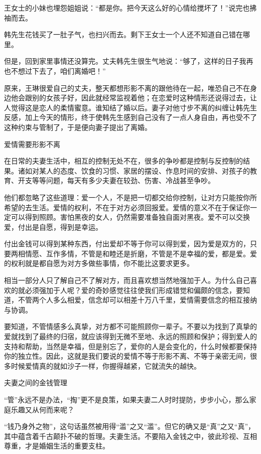\documentclass[12pt,UTF8]{ctexbook}
\begin{document}
王女士的小妹也埋怨姐姐说：“都是你。把今天这么好的心情给搅坏了！”说完也拂袖而去。

韩先生花钱买了一肚子气，也扫兴而去。剩下王女士一个人还不知道自己错在哪里。

但是，回到家里事情还没算完。丈夫韩先生很生气地说：“够了，这样的日子我再也不想过下去了，咱们离婚吧！”

原来，王琳很爱自己的丈夫，整天都想形影不离的跟他待在一起，唯恐自己不在身边他会跟别的女孩子好，因此就经常监视着他；在恋爱时这种情形还说得过去，让人觉得这是恋人的柔情蜜意。谁知结了婚以后。妻子对他寸步不离的纠缠让韩先生反感，加上今天的情形，终于使韩先生感到自己没有了一点人身自由，再也受不了这种约束与管制了，于是便向妻子提出了离婚。





爱情需要形影不离


在日常的夫妻生活中，相互的控制无处不在，很多的争吵都是控制与反控制的结果。诸如对某人的态度、饮食的习惯、家居的摆设、作息时间的安排、对孩子的教育、开支等等问题，每天有多少夫妻在较劲、伤害、冷战甚至争吵。

他们都忽略了这些道理：爱一个人，不是把一切都交给你控制，让对方只能按你所希望的去生活。爱情的权利，不在于对方必须回报爱。爱情的意义不在于保证你一定可以得到照顾。害怕黑夜的女人，仍然需要准备独自面对黑夜。爱不可以交换爱，付出是自愿，得到是幸运。

付出金钱可以得到某种东西，付出爱却不等于你可以得到爱，因为爱是双方的，只要两相情愿、互作多情，不管是和睦还是折磨，不管是不是幸福的爱，都是爱。爱的权利就是都自愿为对方多做些事情，你不能比这要求更多。

相当一部分人只了解自己不了解对方，而且喜欢想当然地强加于人。为什么自己喜欢的就必须强加于人呢？爱的奇妙感觉往往使我们形成错觉和偏颇的信念，要知道，不管两个人多么相爱，信念却可以相差十万八千里，爱情需要信念的相互接纳与协调。

要知道，不管情感多么真挚，对方都不可能照顾你一辈子。不要以为找到了真挚的爱就找到了最终的归宿，就应该得到无微不至地、永远的照顾和保护；得到爱人的支持和帮助，当然是幸福，但是别忘了，爱你的人是会变化的，什么时候都要保持你的独立性。因此，这就是我们要说的爱情不等于形影不离、不等于亲密无间，很多时候爱情真的就如沙子一样，你握得越紧，它就流失的越快。





夫妻之间的金钱管理


“管”永远不是办法，“掏”更不是良策，如果夫妻二人时时提防，步步小心，那么家庭乐趣又从何而来呢？

“钱乃身外之物”，这句话虽然被用得“滥”之又“滥”。但它的确又是“真”之又“真”，其中蕴含着千古颠扑不破的哲理。夫妻生活。不要陷入金钱之中，彼此珍视、互相尊重，才是婚姻生活的重要支柱。
\end{document}
